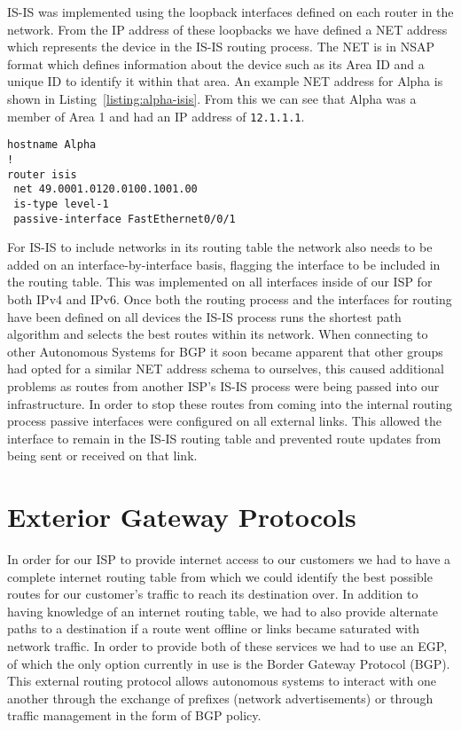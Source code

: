 IS-IS was implemented using the loopback interfaces defined on each router in
the network. From the IP address of these loopbacks we have defined a NET
address which represents the device in the IS-IS routing process. The NET is in
NSAP format which defines information about the device such as its Area ID and
a unique ID to identify it within that area. An example NET address for Alpha
is shown in Listing~\ref{listing:alpha-isis}. From this we can see that Alpha
was a member of Area 1 and had an IP address of \texttt{12.1.1.1}.

\begin{lstlisting}[caption={Alpha IS-IS Configuration}, label={listing:alpha-isis}]
hostname Alpha
!
router isis
 net 49.0001.0120.0100.1001.00
 is-type level-1
 passive-interface FastEthernet0/0/1
\end{lstlisting}

For IS-IS to include networks in its routing table the network also needs to be
added on an interface-by-interface basis, flagging the interface to be included
in the routing table. This was implemented on all interfaces inside of our ISP
for both IPv4 and IPv6. Once both the routing process and the interfaces for
routing have been defined on all devices the IS-IS process runs the shortest
path algorithm and selects the best routes within its network. When connecting
to other Autonomous Systems for BGP it soon became apparent that other groups
had opted for a similar NET address schema to ourselves, this caused additional
problems as routes from another ISP's IS-IS process were being passed into our
infrastructure. In order to stop these routes from coming into the internal
routing process passive interfaces were configured on all external links. This
allowed the interface to remain in the IS-IS routing table and prevented route
updates from being sent or received on that link.

\section{Exterior Gateway Protocols}
In order for our ISP to provide internet access to our customers we had to have
a complete internet routing table from which we could identify the best
possible routes for our customer's traffic to reach its destination over. In
addition to having knowledge of an internet routing table, we had to also
provide alternate paths to a destination if a route went offline or links
became saturated with network traffic. In order to provide both of these
services we had to use an EGP, of which the only option currently in use is the
Border Gateway Protocol (BGP). This external routing protocol allows autonomous
systems to interact with one another through the exchange of prefixes (network
advertisements) or through traffic management in the form of BGP policy.

